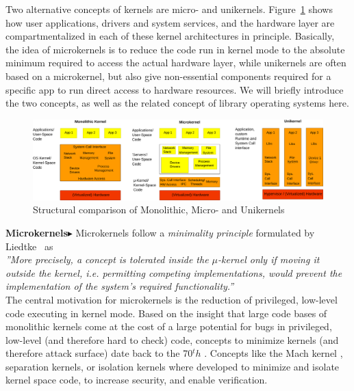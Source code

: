 Two alternative concepts of kernels are micro- and unikernels. Figure~\ref{fig:kernels} shows how user applications, drivers and system services, and the hardware layer are compartmentalized in each of these kernel architectures in principle. Basically, the idea of microkernels is to reduce the code run in kernel mode to the absolute minimum required to access the actual hardware layer, while unikernels are often based on a microkernel, but also give non-essential components required for a specific app to run direct access to hardware resources. We will briefly introduce the two concepts, as well as the related concept of library operating systems here.

\begin{figure}[H]
    \centering
    \includegraphics[scale= 0.36]{figures/kernels.png}
    \caption{Structural comparison of Monolithic, Micro- and Unikernels }
    \label{fig:kernels}
\end{figure}

\textbf{Microkernels$\blacktriangleright$} Microkernels follow a \textit{minimality principle} formulated by Liedtke~\cite{jochen1995mu} as \\

\emph{''More precisely, a concept is tolerated inside the $\mu$-kernel only if moving it outside the kernel, i.e. permitting competing implementations, would prevent the implementation of the system's required functionality.''}\\

The central motivation for microkernels is the reduction of privileged, low-level code executing in kernel mode. Based on the insight that large code bases of monolithic kernels come at the cost of a large potential for bugs in privileged, low-level (and therefore hard to check) code, concepts to minimize kernels (and therefore attack surface) date back to the 70$^th$ \cite{hansen1970nucleus}. Concepts like the Mach kernel \cite{accetta1986mach}, separation kernels\cite{rushby1981design}, or isolation kernels \cite{whitaker2002scale} where developed to minimize and isolate kernel space code, to increase security, and enable verification.  


